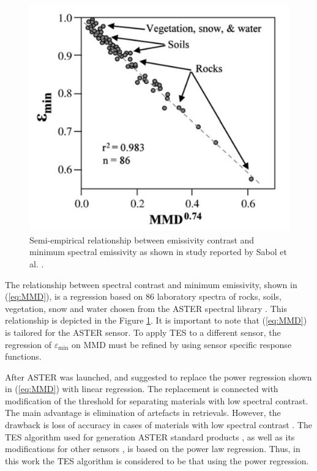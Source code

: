 \begin{figure}[!t]
	\centering
	\includegraphics[scale=0.2]{pics/Chapter_03/EpsMinMMD.png}
	\vspace{1.5 em}
	\caption{Semi-empirical relationship between emissivity contrast and minimum spectral emissivity as shown in study reported by Sabol et al. \cite{SG09}.}
	\label{fig:EpsMinMMD}
\end{figure}

The relationship between spectral contrast and minimum emissivity, shown in (\ref{eq:MMD}), is a regression based on 86 laboratory spectra of rocks, soils, vegetation, snow and water chosen from the ASTER spectral library \cite{BH09}. This relationship is depicted in the Figure \ref{fig:EpsMinMMD}. It is important to note that (\ref{eq:MMD}) is tailored for the ASTER sensor. To apply  {TES to a} different sensor,  {the} regression of $\varepsilon_\mathrm{min}$ on MMD  {must be} refined by using sensor specific response functions. 

After ASTER was launched, \cite{GG06} and \cite{SG09} suggested to replace the power regression shown in (\ref{eq:MMD}) with linear regression. The replacement is connected with modification of the threshold for separating materials with low spectral contrast. The main advantage is elimination of artefacts in retrievals. However, the drawback is loss of accuracy in cases of materials with low spectral contrast \cite{SG09}. The TES algorithm used for generation ASTER standard products \cite{B15}, as well as its modifications for other sensors \cite{SJ06, JS12, WX11, SJ02, JS14, HH11, MB02, HH11-2}, is based on the power law regression. Thus, in this work the TES algorithm is considered to be that using the power regression.


